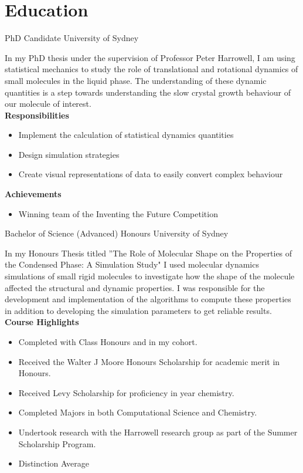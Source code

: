 



\makecvtitle

\vspace{-4em}
\section{Education}

{PhD Candidate}
{University of Sydney}{}{}
{%
In my PhD thesis under the supervision of Professor Peter Harrowell,
I am using statistical mechanics to
study the role of translational and rotational dynamics
of small molecules in the liquid phase.
The understanding of these dynamic quantities is a step
towards understanding the slow crystal growth behaviour of
our molecule of interest.\\
\textbf{Responsibilities}
\begin{itemize}
  \item Implement the calculation of statistical dynamics quantities
  \item Design simulation strategies
  \item Create visual representations of data to easily convert complex behaviour
\end{itemize}
\textbf{Achievements}
\begin{itemize}
  \item Winning team of the Inventing the Future Competition
\end{itemize}
}

{Bachelor of Science (Advanced) Honours}
{University of Sydney}{}{}
{%
In my Honours Thesis titled 
''The Role of Molecular Shape on the Properties of the Condensed Phase: A Simulation Study"
I used molecular dynamics simulations of small rigid molecules to investigate how
the shape of the molecule affected the structural and dynamic properties.
I was responsible for the development and implementation of the algorithms to
compute these properties in addition to developing the simulation parameters
to get reliable results. \\
\textbf{Course Highlights}
\begin{itemize}
  \item Completed with  Class Honours and  in my cohort.
  \item Received the Walter J Moore Honours Scholarship for academic merit in Honours.
  \item Received Levy Scholarship for proficiency in  year chemistry.
  \item Completed Majors in both Computational Science and Chemistry.
  \item Undertook research with the Harrowell research group as part of the Summer Scholarship Program.
  \item Distinction Average
\end{itemize}
}

